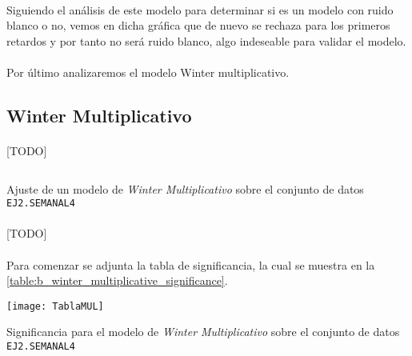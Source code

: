 \documentclass[a4paper, spanish]{article}
\begin{document}
      \paragraph{}
      Siguiendo el análisis de este modelo para determinar si es un modelo con ruido blanco o no, vemos en dicha gráfica que de nuevo se rechaza para los primeros retardos y por tanto no será ruido blanco, algo indeseable para validar el modelo.

      \paragraph{}
      Por último analizaremos el modelo Winter multiplicativo.

    \subsection{Winter Multiplicativo}

      \paragraph{}
      [TODO]

      \begin{listing}[htb!]
        \centering
        \inputminted{SAS}{./res/code/b-01-esm-wintermul.sas}
        \caption{Ajuste de un modelo de \emph{Winter Multiplicativo} sobre el conjunto de datos \texttt{EJ2.SEMANAL4}}
        \label{code:b_winter_multiplicative_esm}
      \end{listing}

      \paragraph{}
      [TODO]

      \paragraph{}
      Para comenzar se adjunta la tabla de significancia, la cual se muestra en la \autoref{table:b_winter_multiplicative_significance}.

      \begin{table}[htb!]
        \centering
        \texttt{[image: TablaMUL]}
        \caption{Significancia para el modelo de \emph{Winter Multiplicativo} sobre el conjunto de datos \texttt{EJ2.SEMANAL4}}
        \label{table:b_winter_multiplicative_significance}
      \end{table}
\end{document}
